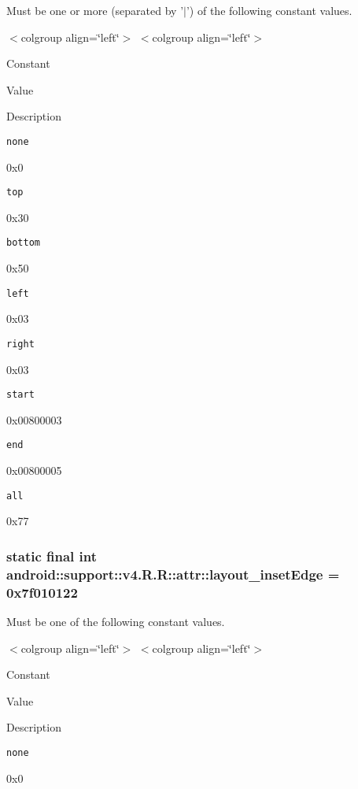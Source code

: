 Must be one or more (separated by '$|$') of the following constant values. \begin{TabularC}{0}
\hline
\end{TabularC}
$<$colgroup align=\char`\"{}left\char`\"{}$>$ $<$colgroup align=\char`\"{}left\char`\"{}$>$ 

Constant

Value

Description 

{\tt none}

0x0

{\tt top}

0x30

{\tt bottom}

0x50

{\tt left}

0x03

{\tt right}

0x03

{\tt start}

0x00800003

{\tt end}

0x00800005

{\tt all}

0x77\hypertarget{classandroid_1_1support_1_1v4_1_1_r_1_1attr_be6ab2265ae501530a1d0c3e4d129530}{
\subsubsection[{layout\_\-insetEdge}]{\setlength{\rightskip}{0pt plus 5cm}static final int android::support::v4.R.R::attr::layout\_\-insetEdge = 0x7f010122}}
\label{classandroid_1_1support_1_1v4_1_1_r_1_1attr_be6ab2265ae501530a1d0c3e4d129530}


Must be one of the following constant values. \begin{TabularC}{0}
\hline
\end{TabularC}
$<$colgroup align=\char`\"{}left\char`\"{}$>$ $<$colgroup align=\char`\"{}left\char`\"{}$>$ 

Constant

Value

Description 

{\tt none}

0x0

